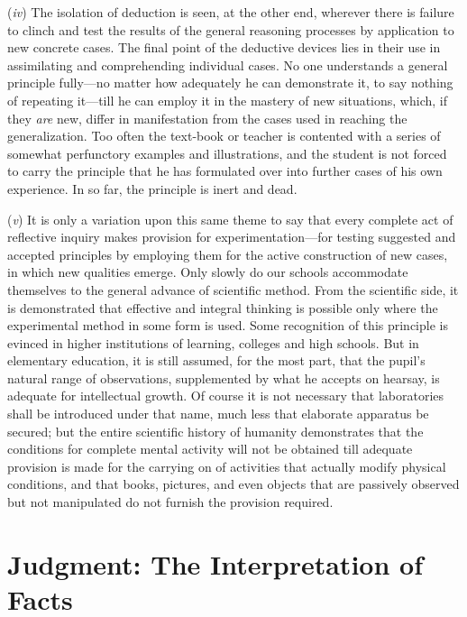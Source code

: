\documentclass[showtrims,ustradepaper]{memoir}
\begin{document}

(\emph{iv}) The isolation of deduction is seen, at the other end,
wherever there is failure to clinch and test the results of the general
reasoning processes by application to new concrete cases. The final
point of the deductive devices lies in their use in assimilating and
comprehending individual cases. No one understands a general principle
fully---no matter how adequately he can demonstrate it, to say nothing
of repeating it---till he can employ it in the mastery of new
situations, which, if they \emph{are} new, differ in manifestation from
the cases used in reaching the generalization. Too often the text-book
or teacher is contented with a series of somewhat perfunctory examples
and illustrations, and the student is not forced to carry the principle
that he has formulated over into further cases of his own experience. In
so far, the principle is inert and dead.


(\emph{v}) It is only a variation upon this same theme to say that every
complete act of reflective inquiry makes provision for
experimentation---for testing suggested and accepted principles by
employing them for the active construction of new cases, in which new
qualities emerge. Only slowly do our schools accommodate themselves to
the general advance of scientific method. From the scientific side, it
is demonstrated that effective and integral thinking is possible only
where the
experimental
method in some form is used. Some recognition of this principle is
evinced in higher institutions of learning, colleges and high schools.
But in elementary education, it is still assumed, for the most part,
that the pupil's natural range of observations, supplemented by what he
accepts on hearsay, is adequate for intellectual growth. Of course it is
not necessary that laboratories shall be introduced under that name,
much less that elaborate apparatus be secured; but the entire scientific
history of humanity demonstrates that the conditions for complete mental
activity will not be obtained till adequate provision is made for the
carrying on of activities that actually modify physical conditions, and
that books, pictures, and even objects that are passively observed but
not manipulated do not furnish the provision
required.

\chapter{Judgment: The Interpretation of Facts}
\end{document}

